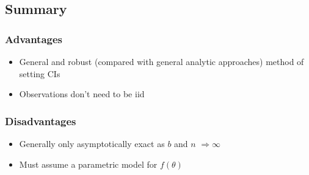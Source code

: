 \documentclass[a4paper,12pt]{article}
\newcommand{\bi}{\begin{itemize}}
\newcommand{\ei}{\end{itemize}}
\begin{document}
\subsection{Summary}

\begin{frame}
    \frametitle{Advantages}
    \bi
        \item General and robust (compared with general analytic approaches) method of setting CIs
        \item Observations don't need to be iid
    \ei
\end{frame}

\begin{frame}
    \frametitle{Disadvantages}
    \bi
        \item Generally only asymptotically exact as $b$ and $n$ $\Rightarrow \infty$
        \item Must assume a parametric model for $f(\theta)$
    \ei
\end{frame}
\end{document}
